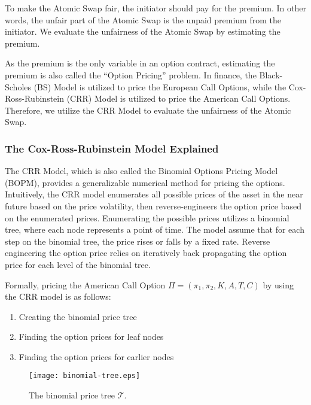 To make the Atomic Swap fair, the initiator should pay for the premium.
In other words, the unfair part of the Atomic Swap is the unpaid premium from the initiator.
We evaluate the unfairness of the Atomic Swap by estimating the premium.

As the premium is the only variable in an option contract, estimating the premium is also called the ``Option Pricing'' problem.
In finance, the Black-Scholes (BS) Model is utilized to price the European Call Options,
while the Cox-Ross-Rubinstein (CRR) Model is utilized to price the American Call Options.
Therefore, we utilize the CRR Model to evaluate the unfairness of the Atomic Swap.

\subsubsection{The Cox-Ross-Rubinstein Model Explained}

The CRR Model, which is also called the Binomial Options Pricing Model (BOPM), provides a generalizable numerical method for pricing the options.
Intuitively, the CRR model enumerates all possible prices of the asset in the near future based on the price volatility,
then reverse-engineers the option price based on the enumerated prices.
Enumerating the possible prices utilizes a binomial tree, where each node represents a point of time.
The model assume that for each step on the binomial tree, the price rises or falls by a fixed rate.
Reverse engineering the option price relies on iteratively back propagating the option price for each level of the binomial tree.

Formally, pricing the American Call Option $\Pi = (\pi_1, \pi_2, K, A, T, C)$ by using the CRR model is as follows:

\begin{enumerate}
    \item Creating the binomial price tree
    \item Finding the option prices for leaf nodes
    \item Finding the option prices for earlier nodes 
\end{enumerate}


\begin{figure}
    \texttt{[image: binomial-tree.eps]}
    \caption{The binomial price tree $\mathcal{T}$.}
    \label{fig:binomial_tree}
\end{figure}

